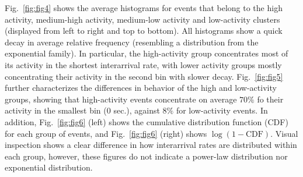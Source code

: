 \documentclass[10pt,letterpaper]{article}
\begin{document}




Fig.~\ref{fig:fig4} shows the average histograms for events that
belong to the high activity, medium-high activity, medium-low activity
and low-activity clusters (displayed from left to right and top to
bottom). All histograms show a quick decay in average relative
frequency (resembling a distribution from the exponential family). In
particular, the high-activity group concentrates most of its activity
in the shortest interarrival rate, with lower activity groups mostly
concentrating their activity in the second bin with slower
decay. Fig.~\ref{fig:fig5} further characterizes the differences in
behavior of the high and low-activity groups, showing that
high-activity events concentrate on average $70\%$ fo their activity
in the smallest bin ($0$ sec.), against $8\%$ for low-activity
events. In addition, Fig.~\ref{fig:fig6} (left) shows the cumulative
distribution function (CDF) for each group of events, and
Fig.~\ref{fig:fig6} (right) shows $\log{(1 - \mathrm{CDF})}$. Visual
inspection shows a clear difference in how interarrival rates are
distributed within each group, however, these figures do not indicate a
power-law distribution nor exponential distribution.%
\end{document}
